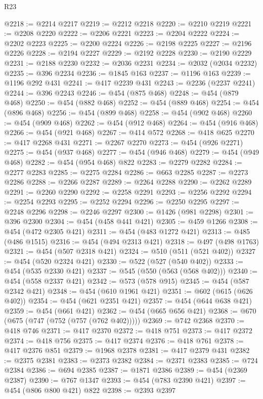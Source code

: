 \begin{lexlean}{R23}
\begin{coremodule}
{{{{{{{{{{{{{{{{{{{{{{{{{{{{{{{{{{{{{{{{{{{{{{{{{{{{{{{{{{{{{{{{{{{{{{{{{{{{{{{{{{{{{{{{{{{{{@2218 := @2214 @2217
@2219 := @2212 @2218
@2220 := @2210 @2219
@2221 := @2208 @2220
@2222 := @2206 @2221
@2223 := @2204 @2222
@2224 := @2202 @2223
@2225 := @2200 @2224
@2226 := @2198 @2225
@2227 := @2196 @2226
@2228 := @2194 @2227
@2229 := @2192 @2228
@2230 := @2190 @2229
@2231 := @2188 @2230
@2232 := @2036 @2231
@2234 := @2032 (@2034 @2232)
@2235 := @396 @2234
@2236 := @1845 @163
@2237 := @1196 @163
@2239 := @1196 @292 @431
@2241 := @417 @2239 @431
@2243 := @2236 (@2237 @2241)
@2244 := @396 @2243
@2246 := @454 (@875 @468)
@2248 := @454 (@879 @468)
@2250 := @454 (@882 @468)
@2252 := @454 (@889 @468)
@2254 := @454 (@896 @468)
@2256 := @454 (@899 @468)
@2258 := @454 (@902 @468)
@2260 := @454 (@909 @468)
@2262 := @454 (@912 @468)
@2264 := @454 (@916 @468)
@2266 := @454 (@921 @468)
@2267 := @414 @572
@2268 := @418 @625
@2270 := @417 @2268 @431
@2271 := @2267 @2270
@2273 := @454 (@926 @2271)
@2275 := @454 (@937 @468)
@2277 := @454 (@946 @468)
@2279 := @454 (@949 @468)
@2282 := @454 (@954 @468) @822
@2283 := @2279 @2282
@2284 := @2277 @2283
@2285 := @2275 @2284
@2286 := @663 @2285
@2287 := @2273 @2286
@2288 := @2266 @2287
@2289 := @2264 @2288
@2290 := @2262 @2289
@2291 := @2260 @2290
@2292 := @2258 @2291
@2293 := @2256 @2292
@2294 := @2254 @2293
@2295 := @2252 @2294
@2296 := @2250 @2295
@2297 := @2248 @2296
@2298 := @2246 @2297
@2300 := @1426 (@981 @2298)
@2301 := @396 @2300
@2304 := @454 (@458 @441 @421)
@2305 := @459 @1266
@2308 := @454 (@472 @2305 @421)
@2311 := @454 (@483 @1272 @421)
@2313 := @485 (@486 @1515)
@2316 := @454 (@494 @2313 @421)
@2318 := @497 (@498 @1763)
@2321 := @454 (@507 @2318 @421)
@2324 := @510 (@511 (@521 @402))
@2327 := @454 (@520 @2324 @421)
@2330 := @522 (@527 (@540 @402))
@2333 := @454 (@535 @2330 @421)
@2337 := @545 (@550 (@563 (@568 @402)))
@2340 := @454 (@558 @2337 @421)
@2342 := @573 (@578 @915)
@2345 := @454 (@587 @2342 @421)
@2348 := @454 (@610 @1961 @421)
@2351 := @602 (@615 (@626 @402))
@2354 := @454 (@621 @2351 @421)
@2357 := @454 (@644 @638 @421)
@2359 := @454 (@661 @421)
@2362 := @454 (@665 @656 @421)
@2368 := @670 (@675 (@747 (@752 (@757 (@762 @402)))))
@2369 := @742 @2368
@2370 := @418 @746
@2371 := @417 @2370
@2372 := @418 @751
@2373 := @417 @2372
@2374 := @418 @756
@2375 := @417 @2374
@2376 := @418 @761
@2378 := @417 @2376 @851
@2379 := @1968 @2378
@2381 := @417 @2379 @431
@2382 := @2375 @2381
@2383 := @2373 @2382
@2384 := @2371 @2383
@2385 := @724 @2384
@2386 := @694 @2385
@2387 := @1871 @2386
@2389 := @454 (@2369 @2387)
@2390 := @767 @1347
@2393 := @454 (@783 @2390 @421)
@2397 := @454 (@806 @800 @421) @822
@2398 := @2393 @2397
}}}}}}}}}}}}}}}}}}}}}}}}}}}}}}}}}}}}}}}}}}}}}}}}}}}}}}}}}}}}}}}}}}}}}}}}}}}}}}}}}}}}}}}}}}}}}
\end{coremodule}
\end{lexlean}

